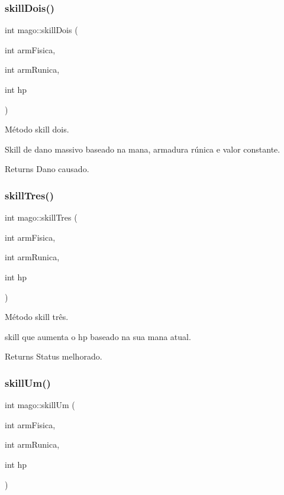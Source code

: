 \subsubsection{\texorpdfstring{skill\+Dois()}{skillDois()}}
{\footnotesize\ttfamily int mago\+::skill\+Dois (\begin{DoxyParamCaption}\item[{int}]{arm\+Fisica,  }\item[{int}]{arm\+Runica,  }\item[{int}]{hp }\end{DoxyParamCaption})}



Método skill dois. 

Skill de dano massivo baseado na mana, armadura rúnica e valor constante. \begin{DoxyReturn}{Returns}
Dano causado. 
\end{DoxyReturn}
\mbox{\label{classmago_a77280ba40aac7fdf8766950261821a39}} 
\subsubsection{\texorpdfstring{skill\+Tres()}{skillTres()}}
{\footnotesize\ttfamily int mago\+::skill\+Tres (\begin{DoxyParamCaption}\item[{int}]{arm\+Fisica,  }\item[{int}]{arm\+Runica,  }\item[{int}]{hp }\end{DoxyParamCaption})}



Método skill três. 

skill que aumenta o hp baseado na sua mana atual. \begin{DoxyReturn}{Returns}
Status melhorado. 
\end{DoxyReturn}
\mbox{\label{classmago_a039c9975fad5dbc54d5f3ab51bf3df44}} 
\subsubsection{\texorpdfstring{skill\+Um()}{skillUm()}}
{\footnotesize\ttfamily int mago\+::skill\+Um (\begin{DoxyParamCaption}\item[{int}]{arm\+Fisica,  }\item[{int}]{arm\+Runica,  }\item[{int}]{hp }\end{DoxyParamCaption})}



